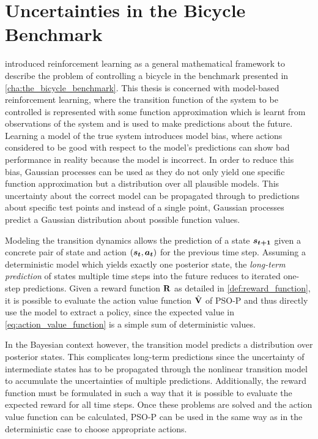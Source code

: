 \chapter{Uncertainties in the Bicycle Benchmark}
\label{cha:solution}
 introduced reinforcement learning as a general mathematical framework to describe the problem of controlling a bicycle in the benchmark presented in \cref{cha:the_bicycle_benchmark}.
This thesis is concerned with model-based reinforcement learning, where the transition function of the system to be controlled is represented with some function approximation which is learnt from observations of the system and is used to make predictions about the future.
Learning a model of the true system introduces model bias, where actions considered to be good with respect to the model's predictions can show bad performance in reality because the model is incorrect.
In order to reduce this bias, Gaussian processes can be used as they do not only yield one specific function approximation but a distribution over all plausible models.
This uncertainty about the correct model can be propagated through to predictions about specific test points and instead of a single point, Gaussian processes predict a Gaussian distribution about possible function values.

Modeling the transition dynamics allows the prediction of a state $\bm{s_{t+1}}$ given a concrete pair of state and action $(\bm{s_t}, \bm{a_t})$ for the previous time step.
Assuming a deterministic model which yields exactly one posterior state, the \emph{long-term prediction} of states multiple time steps into the future reduces to iterated one-step predictions.
Given a reward function $\operatorname{\mathbf{R}}$ as detailed in \cref{def:reward_function}, it is possible to evaluate the action value function $\operatorname{\hat{\operatorname{\mathbf{V}}}}$ of PSO-P and thus directly use the model to extract a policy, since the expected value in \cref{eq:action_value_function} is a simple sum of deterministic values.

In the Bayesian context however, the transition model predicts a distribution over posterior states.
This complicates long-term predictions since the uncertainty of intermediate states has to be propagated through the nonlinear transition model to accumulate the uncertainties of multiple predictions.
Additionally, the reward function must be formulated in such a way that it is possible to evaluate the expected reward for all time steps.
Once these problems are solved and the action value function can be calculated, PSO-P can be used in the same way as in the deterministic case to choose appropriate actions.

